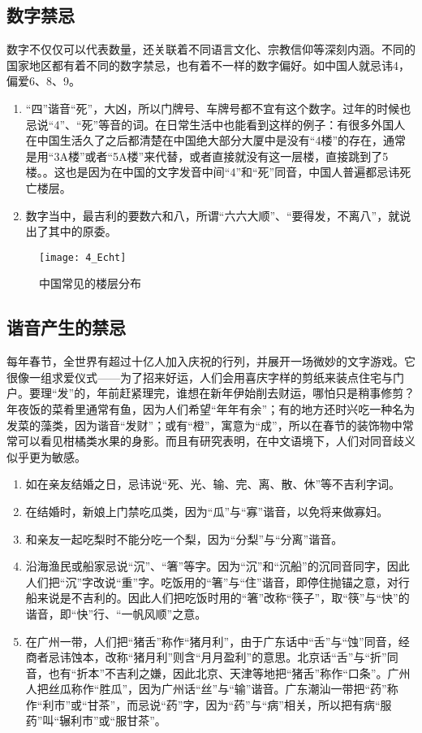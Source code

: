 \subsection{数字禁忌}

    数字不仅仅可以代表数量，还关联着不同语言文化、宗教信仰等深刻内涵。不同的国家地区都有着不同的数字禁忌，也有着不一样的数字偏好。如中国人就忌讳4，偏爱6、8、9。
    \begin{enumerate}
    \item 
    “四”谐音“死”，大凶，所以门牌号、车牌号都不宜有这个数字。过年的时候也忌说“4”、“死”等音的词。在日常生活中也能看到这样的例子：有很多外国人在中国生活久了之后都清楚在中国绝大部分大厦中是没有“4楼”的存在，通常是用“3A楼”或者“5A楼”来代替，或者直接就没有这一层楼，直接跳到了5楼。。这也是因为在中国的文字发音中间“4”和“死”同音，中国人普遍都忌讳死亡楼层。
    \item 
    数字当中，最吉利的要数六和八，所谓“六六大顺”、“要得发，不离八”，就说出了其中的原委。　　
        
    \end{enumerate}
\begin{figure}[htb]
    \centering
    \texttt{[image: 4\_Echt]}
    \caption{中国常见的楼层分布}
\end{figure}


\subsection{谐音产生的禁忌}

    每年春节，全世界有超过十亿人加入庆祝的行列，并展开一场微妙的文字游戏。它很像一组求爱仪式——为了招来好运，人们会用喜庆字样的剪纸来装点住宅与门户。要理“发”的，年前赶紧理完，谁想在新年伊始削去财运，哪怕只是稍事修剪？年夜饭的菜肴里通常有鱼，因为人们希望“年年有余”；有的地方还时兴吃一种名为发菜的藻类，因为谐音“发财”；或有“橙”，寓意为“成”，所以在春节的装饰物中常常可以看见柑橘类水果的身影。而且有研究表明，在中文语境下，人们对同音歧义似乎更为敏感。
    \begin{enumerate}
    \item 
   如在亲友结婚之日，忌讳说“死、光、输、完、离、散、休”等不吉利字词。
   \item 
   在结婚时，新娘上门禁吃瓜类，因为“瓜”与“寡”谐音，以免将来做寡妇。
   \item 
   和亲友一起吃梨时不能分吃一个梨，因为“分梨”与“分离”谐音。
   \item 
   沿海渔民或船家忌说“沉”、“箸”等字。因为“沉”和“沉船”的沉同音同字，因此人们把“沉”字改说“重”字。吃饭用的“箸”与“住”谐音，即停住抛锚之意，对行船来说是不吉利的。因此人们把吃饭时用的“箸”改称“筷子”，取“筷”与“快”的谐音，即“快”行、“一帆风顺”之意。
   \item 
   在广州一带，人们把“猪舌”称作“猪月利”，由于广东话中“舌”与“蚀”同音，经商者忌讳蚀本，改称“猪月利”则含“月月盈利”的意思。北京话“舌”与“折”同音，也有“折本”不吉利之嫌，因此北京、天津等地把“猪舌”称作“口条”。广州人把丝瓜称作“胜瓜”，因为广州话“丝”与“输”谐音。广东潮汕一带把“药”称作“利市”或“甘茶”，而忌说“药”字，因为“药”与“病”相关，所以把有病“服药”叫“辗利市”或“服甘茶”。
        
    \end{enumerate}

